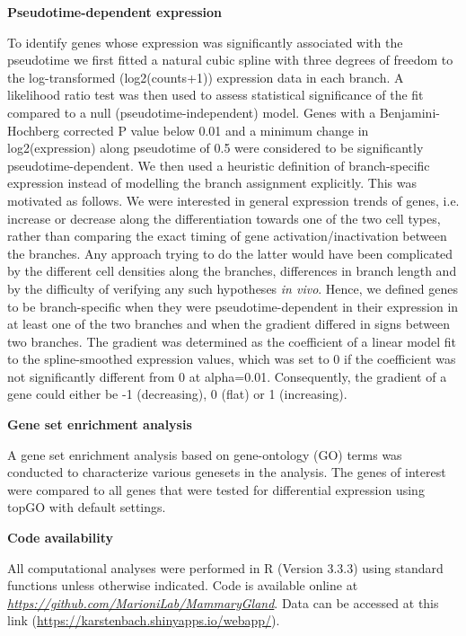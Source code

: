 \documentclass[titlepage, 12pt, oneside]{amsart}
\begin{document}
\textbf{Pseudotime-dependent expression}

To identify genes whose expression was significantly associated with the pseudotime we first fitted a natural cubic spline with three degrees of freedom to the log-transformed (log2(counts+1)) expression data in each branch.
A likelihood ratio test was then used to assess statistical significance of the fit compared to a null (pseudotime-independent) model.
Genes with a Benjamini-Hochberg corrected P value below 0.01 and a minimum change in log2(expression) along pseudotime of 0.5 were considered to be significantly pseudotime-dependent.
We then used a heuristic definition of branch-specific expression instead of modelling the branch assignment explicitly.
This was motivated as follows.
We were interested in general expression trends of genes, i.e. increase or decrease along the differentiation towards one of the two cell types, rather than comparing the exact timing of gene activation/inactivation between the branches.
Any approach trying to do the latter would have been complicated by the different cell densities along the branches, differences in branch length and by the difficulty of verifying any such hypotheses \textit{in vivo}.
Hence, we defined genes to be branch-specific when they were pseudotime-dependent in their expression in at least one of the two branches and when the gradient differed in signs between two branches.
The gradient was determined as the coefficient of a linear model fit to the spline-smoothed expression values, which was set to 0 if the coefficient was not significantly different from 0 at alpha=0.01.
Consequently, the gradient of a gene could either be -1 (decreasing), 0 (flat) or 1 (increasing).

\textbf{Gene set enrichment analysis}

A gene set enrichment analysis based on gene-ontology (GO) terms was conducted to characterize various genesets in the analysis.
The genes of interest were compared to all genes that were tested for differential expression using topGO with default settings\autocite{Alexa2016}.

\textbf{Code availability}

All computational analyses were performed in R (Version 3.3.3) using standard functions unless otherwise indicated.
Code is available online at \href{https://github.com/MarioniLab/MammaryGland}{\textit{https://github.com/MarioniLab/MammaryGland}}.
Data can be accessed at this link (\url{https://karstenbach.shinyapps.io/webapp/}).
\end{document}
